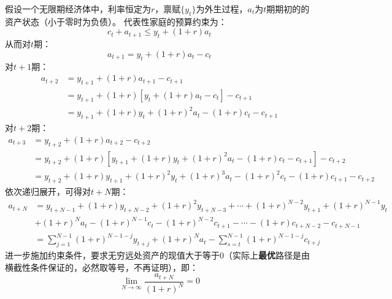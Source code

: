 \begin{example}
    假设一个无限期经济体中，利率恒定为$r$，禀赋$\{y_t\}$为外生过程，$a_t$为$t$期期初的的资产状态（小于零时为负债）。
    代表性家庭的预算约束为：
    \begin{equation*}
        c_t+a_{t+1} \leq y_t + \left(1+r\right)a_t
    \end{equation*}
    从而对$t$期：
    \begin{equation*}
       a_{t+1} = y_t+(1+r)a_t-c_t
    \end{equation*}
    对$t+1$期：
    \begin{equation*}
        \begin{aligned}
            a_{t+2} &= y_{t+1}+(1+r)a_{t+1}-c_{t+1} \\
                &=  y_{t+1}+(1+r)\left[y_t+(1+r)a_t-c_t\right]-c_{t+1} \\
                &= y_{t+1}+(1+r)y_t+(1+r)^2a_t-(1+r)c_t-c_{t+1}
        \end{aligned}
    \end{equation*}
    对$t+2$期：
    \begin{equation*}
        \begin{aligned}
            a_{t+3} &= y_{t+2}+(1+r)a_{t+2}-c_{t+2} \\
                &=  y_{t+2}+(1+r)\left[y_{t+1}+(1+r)y_t+(1+r)^2a_t-(1+r)c_t-c_{t+1}\right]-c_{t+2} \\
                &= y_{t+2}+(1+r)y_{t+1}+(1+r)^2y_t+(1+r)^3a_t-(1+r)^2c_t-(1+r)c_{t+1}-c_{t+2}
        \end{aligned}
    \end{equation*}
    依次递归展开，可得对$t+N$期：
    \begin{equation*}
        \begin{aligned}
            a_{t+N} &= y_{t+N-1}+(1+r)y_{t+N-2}+(1+r)^2y_{t+N-3}+\cdots + (1+r)^{N-2}y_{t+1}+(1+r)^{N-1}y_t \\
                &+ (1+r)^N a_t -(1+r)^{N-1}c_t-(1+r)^{N-2}c_{t+1}-\cdots - (1+r)c_{t+N-2}-c_{t+N-1} \\
                & =\sum_{j=1}^{N-1}(1+r)^{N-1-j} y_{t+j}+(1+r)^N a_t-\sum_{s=t}^{N-1}(1+r)^{N-1-j} c_{t+j}
        \end{aligned}
    \end{equation*}
    进一步施加约束条件，要求无穷远处资产的现值大于等于0（实际上\textbf{最优}路径是由横截性条件保证的，必然取等号，不再证明），即：
    \begin{equation*}
        \lim_{N\rightarrow\infty}\frac{a_{t+N}}{(1+r)^N} = 0

\end{equation*}
\end{example}
